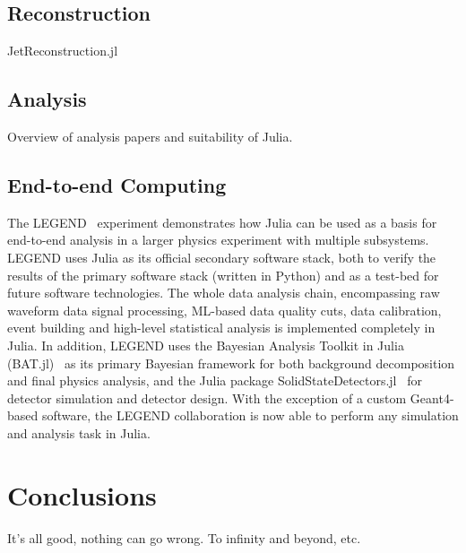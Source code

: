 \documentclass{webofc}
\begin{document}
\subsection{Reconstruction}

JetReconstruction.jl

\subsection{Analysis}

Overview of analysis papers and suitability of Julia.

\subsection{End-to-end Computing}

The LEGEND~\cite{LEGEND:2017AIPC} experiment demonstrates how Julia can be used
as a basis for end-to-end analysis in a larger physics experiment with multiple
subsystems. LEGEND uses Julia as its official secondary software stack, both to
verify the results of the primary software stack (written in Python) and as a
test-bed for future software technologies. The whole data analysis chain,
encompassing raw waveform data signal processing, ML-based data quality cuts,
data calibration, event building and high-level statistical analysis is
implemented completely in Julia. In addition, LEGEND uses the Bayesian Analysis
Toolkit in Julia (BAT.jl)~\cite{Schulz:2021BAT} as its primary Bayesian
framework for both background decomposition and final physics analysis, and the
Julia package SolidStateDetectors.jl~\cite{Abt:2021SSD} for detector simulation
and detector design. With the exception of a custom Geant4-based software, the
LEGEND collaboration is now able to perform any simulation and analysis task in
Julia.


\section{Conclusions}

It's all good, nothing can go wrong. To infinity and beyond, etc.

\sloppy
\raggedright

\end{document}
